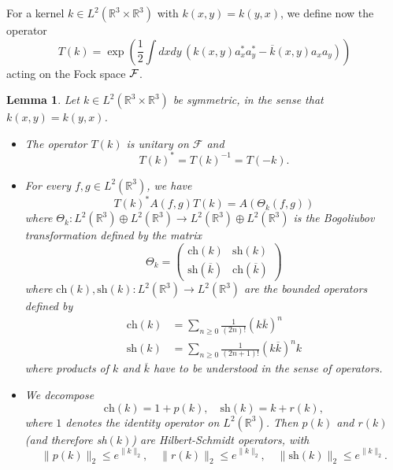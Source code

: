 \documentclass[11pt,a4paper]{article}
\newtheorem{lem}[thm]{Lemma}
\newcommand{\bR}{{\mathbb R}}
\newcommand{\cF}{{\cal F}}
\newcommand{\R}{\mathbb{R}}
\begin{document}
For a kernel $k \in L^2 (\bR^3 \times \bR^3)$ with $k (x,y) = k(y,x)$, we define now the operator 
\begin{equation}\label{eq:Tk-def} T (k) = \exp \left(\frac{1}{2} \int dx dy \, \left(k(x,y) a_x^* a_y^* - \overline{k} (x,y) a_x a_y \right) \right) \end{equation} 
acting on the Fock space $\cF$. 
\begin{lem} \label{l:bt}
Let $k \in L^2(\R^3 \times \R^3)$ be symmetric, in the sense that $k(x,y) = k(y,x)$.
\begin{itemize}
\item[(i)] The operator $T(k)$ is unitary on $\mathcal{F}$ and
  \[
    T(k)^* = T(k)^{-1} = T(-k).
  \]
\item[(ii)] For every $f,g \in L^2 (\bR^3)$, we have 
\begin{equation}\label{eq:TAT} T (k)^* A(f,g) T(k) = A (\Theta_k (f,g)) \end{equation}
where $\Theta_k : L^2 (\bR^3) \oplus L^2 (\bR^3) \to L^2 (\bR^3) \oplus L^2 (\bR^3)$ is the Bogoliubov transformation defined by the matrix 
\[ \Theta_k = \left(\begin{array}{ll} \text{ch} (k)  & \text{sh} (k)  \\ \text{sh} (\overline{k}) & \text{ch} (\overline{k}) \end{array} \right) \]
where $\text{ch} (k), \text{sh} (k) : L^2 (\bR^3) \to L^2 (\bR^3)$ are the bounded operators defined by 
\[ \begin{split} 
\text{ch} (k) & = \sum_{n\geq 0} \frac{1}{(2n)!} (k\overline{k})^n \\
\text{sh} (k)  & = \sum_{n \geq 0} \frac{1}{(2n+1)!} (k\overline{k})^n k \end{split} \]
where products of $k$ and $\overline{k}$ have to be understood in the sense of operators. 
\item[(iii)] We decompose 
\begin{equation}\label{eq:pr-def} \text{ch} (k) = 1 + p (k) , \quad \text{sh} (k) = k + r (k), \end{equation}
where $1$ denotes the identity operator on $L^2 (\bR^3)$. Then $p (k)$ and $r (k)$ (and therefore sh$(k)$) are Hilbert-Schmidt operators, with 
\begin{equation}
 \| p (k) \|_{2}  \le e^{\| k \|_{2}}, \quad 
\| r (k) \|_{2} \le e^{\| k \|_{2}},  \quad \| \text{sh} (k) \|_2 \leq  e^{\| k \|_{2}}.
\end{equation}

\end{itemize}
\end{lem}
\end{document}
